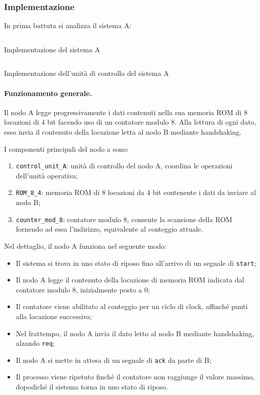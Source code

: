 \subsubsection{Implementazione}
In prima battuta si analizza il sistema A:

\begin{code}
    \inputminted{vhdl}{vhdl/december_exam_system_A.vhd}
    \caption{Implementazione del sistema A}
    \label{cod:december_exam_system_A}
\end{code}

\begin{code}
    \inputminted{vhdl}{vhdl/december_exam_control_unit_A.vhd}
    \caption{Implementazione dell'unità di controllo del sistema A}
    \label{cod:december_exam_control_unit_A}
\end{code}

\paragraph{Funzionamento generale.}
Il nodo A legge progressivamente i dati contenuti nella sua memoria ROM di 8 locazioni di 4 bit facendo uso di un contatore modulo 8. Alla lettura di ogni dato, esso invia il contenuto della locazione letta al nodo B mediante handshaking.

I componenti principali del nodo a sono:

\begin{enumerate}
    \item \texttt{control\_unit\_A}: unità di controllo del nodo A, coordina le operazioni dell'unità operativa;
    \item \texttt{ROM\_8\_4}: memoria ROM di 8 locazioni da 4 bit contenente i dati da inviare al nodo B;
    \item \texttt{counter\_mod\_8}: contatore modulo 8, consente la scansione della ROM fornendo ad essa l'indirizzo, equivalente al conteggio attuale.
\end{enumerate}

Nel dettaglio, il nodo A funziona nel seguente modo:

\begin{itemize}
    \item Il sistema si trova in uno stato di riposo fino all'arrivo di un segnale di \texttt{start};
    \item Il nodo A legge il contenuto della locazione di memoria ROM indicata dal contatore modulo 8, inizialmente posto a 0;
    \item Il contatore viene abilitato al conteggio per un ciclo di clock, affinché punti alla locazione successiva;
    \item Nel frattempo, il nodo A invia il dato letto al nodo B mediante handshaking, alzando \texttt{req};
    \item Il nodo A si mette in attesa di un segnale di \texttt{ack} da parte di B;
    \item Il processo viene ripetuto finché il contatore non raggiunge il valore massimo, dopodiché il sistema torna in uno stato di riposo.
\end{itemize}

